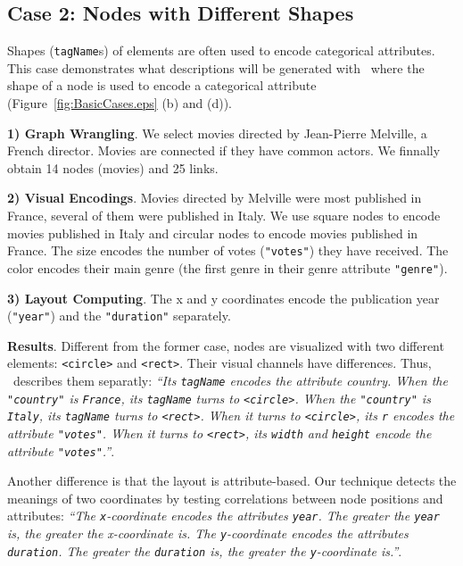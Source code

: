 \subsection{Case 2: Nodes with Different Shapes}
Shapes (\texttt{tagName}s) of elements are often used to encode categorical attributes.
This case demonstrates what descriptions will be generated with \ApproachName~where the shape of a node is used to encode a categorical attribute (Figure~\ref{fig:BasicCases.eps} (b) and (d)).

\textbf{1) Graph Wrangling}. 
We select movies directed by Jean-Pierre Melville, a French director. 
Movies are connected if they have common actors. 
We finnally obtain 14 nodes (movies) and 25 links.

\textbf{2) Visual Encodings}.
Movies directed by Melville were most published in France, several of them were published in Italy.
We use square nodes to encode movies published in Italy and circular nodes to encode movies published in France.
The size encodes the number of votes (\texttt{"votes"}) they have received.
The color encodes their main genre (the first genre in their genre attribute \texttt{"genre"}).

\textbf{3) Layout Computing}.
The x and y coordinates encode the publication year (\texttt{"year"}) and the \texttt{"duration"} separately.

\textbf{Results}.
Different from the former case, nodes are visualized with two different elements: \texttt{<circle>} and \texttt{<rect>}.
Their visual channels have differences.
Thus, \ApproachName~describes them separatly:
\textit{``Its \texttt{tagName} encodes the attribute country.
When the \texttt{"country"} is \texttt{France}, its \texttt{tagName} turns to \texttt{<circle>}.
When the \texttt{"country"} is \texttt{Italy}, its \texttt{tagName} turns to \texttt{<rect>}.
When it turns to \texttt{<circle>}, 
its \texttt{r} encodes the attribute \texttt{"votes"}.
When it turns to \texttt{<rect>}, its \texttt{width} and \texttt{height} encode the attribute \texttt{"votes"}.''}.

Another difference is that the layout is attribute-based.
Our technique detects the meanings of two coordinates by testing correlations between node positions and attributes: 
\textit{``The \texttt{x}-coordinate encodes the attributes \texttt{year}. 
The greater the \texttt{year} is, the greater the x-coordinate is.
The \texttt{y}-coordinate encodes the attributes \texttt{duration}.
The greater the \texttt{duration} is, the greater the \texttt{y}-coordinate is.''}.

